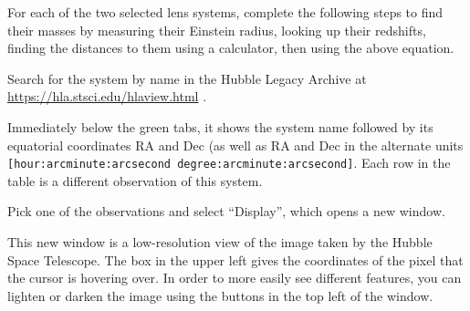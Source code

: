 For each of the two selected lens systems, complete the following steps to find their masses by measuring their Einstein radius, looking up their redshifts, finding the distances to them using a calculator, then using the above equation.

\begin{steps}	
	
	\item Search for the system by name in the Hubble Legacy Archive at \url{https://hla.stsci.edu/hlaview.html} .
\end{steps}
	
Immediately below the green tabs, it shows the system name followed by its equatorial coordinates RA and Dec (as well as RA and Dec in the alternate units \texttt{[hour:arcminute:arcsecond degree:arcminute:arcsecond]}. Each row in the table is a different observation of this system.

\begin{steps}	
	\item Pick one of the observations and select ``Display'', which opens a new window.
\end{steps}

This new window is a low-resolution view of the image taken by the Hubble Space Telescope. The box in the upper left gives the coordinates of the pixel that the cursor is hovering over. In order to more easily see different features, you can lighten or darken the image using the buttons in the top left of the window.

